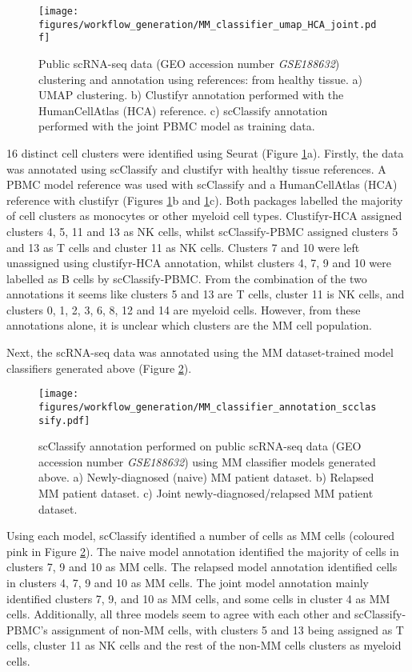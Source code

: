 \begin{figure}[htb]
\centering
\texttt{[image: figures/workflow\_generation/MM\_classifier\_umap\_HCA\_joint.pdf]}
\caption[Public scRNA-seq data clustering and annotation]{Public scRNA-seq data (GEO accession number \textit{GSE188632}) clustering and annotation using references: from healthy tissue.
a) UMAP clustering.
b) Clustifyr annotation performed with the HumanCellAtlas (HCA) reference.
c) scClassify annotation performed with the joint PBMC model as training data.
}
\label{fig:mm_class_umap_annotate}
\end{figure}
%
16 distinct cell clusters were identified using Seurat (Figure \ref{fig:mm_class_umap_annotate}a).
Firstly, the data was annotated using scClassify and clustifyr with healthy tissue references.
A PBMC model reference was used with scClassify and a HumanCellAtlas (HCA) reference with clustifyr (Figures \ref{fig:mm_class_umap_annotate}b and \ref{fig:mm_class_umap_annotate}c).
Both packages labelled the majority of cell clusters as monocytes or other myeloid cell types.
Clustifyr-HCA assigned clusters 4, 5, 11 and 13 as NK cells, whilst scClassify-PBMC assigned clusters 5 and 13 as T cells and cluster 11 as NK cells.
Clusters 7 and 10 were left unassigned using clustifyr-HCA annotation, whilst clusters 4, 7, 9 and 10 were labelled as B cells by scClassify-PBMC.
From the combination of the two annotations it seems like clusters 5 and 13 are T cells, cluster 11 is NK cells, and clusters 0, 1, 2, 3, 6, 8, 12 and 14 are myeloid cells.
However, from these annotations alone, it is unclear which clusters are the MM cell population.

Next, the scRNA-seq data was annotated using the MM dataset-trained model classifiers generated above (Figure \ref{fig:mm_classifier_scclassify_annotate}).
%
\begin{figure}[htb]
\centering
\texttt{[image: figures/workflow\_generation/MM\_classifier\_annotation\_scclassify.pdf]}
\caption[Public scRNA-seq data MM classifier annotation]{scClassify annotation performed on public scRNA-seq data (GEO accession number \textit{GSE188632}) using MM classifier models generated above.
a) Newly-diagnosed (naive) MM patient dataset.
b) Relapsed MM patient dataset.
c) Joint newly-diagnosed/relapsed MM patient dataset.
}
\label{fig:mm_classifier_scclassify_annotate}
\end{figure}
%
%
Using each model, scClassify identified a number of cells as MM cells (coloured pink in Figure \ref{fig:mm_classifier_scclassify_annotate}).
The naive model annotation identified the majority of cells in clusters 7, 9 and 10 as MM cells.
The relapsed model annotation identified cells in clusters 4, 7, 9 and 10 as MM cells.
The joint model annotation mainly identified clusters 7, 9, and 10 as MM cells, and some cells in cluster 4 as MM cells.
Additionally, all three models seem to agree with each other and scClassify-PBMC's assignment of non-MM cells, with clusters 5 and 13 being assigned as T cells, cluster 11 as NK cells and the rest of the non-MM cells clusters as myeloid cells.

